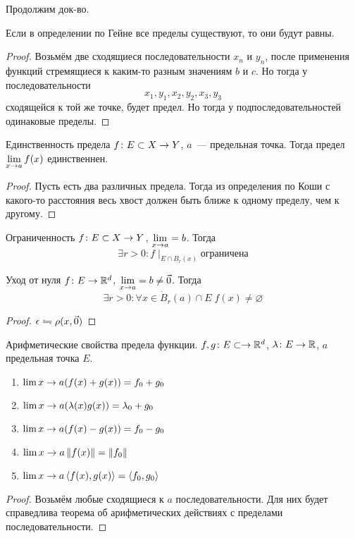 Продолжим док-во.

\begin{Rem}
Если в определении по Гейне все пределы существуют, то они будут равны.
\end{Rem}
\begin{proof}
Возьмём две сходящиеся последовательности $x_n$ и $y_n$, после применения функций стремящиеся к каким-то разным значениям $b$ и $c$. Но тогда
у последовательности 
$$x_1, y_1, x_2, y_2, x_3, y_3$$
сходящейся к той же точке, будет предел. Но тогда у подпоследовательностей одинаковые пределы.
\end{proof}

\begin{assertion}{Единственность предела}
$f\colon E \subset X \rightarrow Y$, $a$~--- предельная точка. Тогда предел $\lim\limits_{x\rightarrow a} f(x)$ единственнен.
\end{assertion}
\begin{proof}
Пусть есть два различных предела. Тогда из определения по Коши с какого-то расстояния весь хвост должен быть ближе к одному пределу, чем к другому.
\end{proof}

\begin{theorem}{Ограниченность}
$f\colon E \subset X \rightarrow Y$, $\lim\limits_{x\rightarrow a} = b$. Тогда 
$$\exists r>0\colon f \mid_{E \cap B_r(x)}\text{ограничена}$$
\end{theorem}

\begin{theorem}{Уход от нуля}
$f\colon E \rightarrow \mathbb{R}^d$, $\lim\limits_{x\rightarrow a} = b \ne \vec 0$. Тогда
$$\exists r>0\colon \forall x \in \dot B_r(a) \cap E\; f(x) \ne \varnothing$$
\end{theorem}
\begin{proof}
$\epsilon \leftrightharpoons \rho(x, \vec 0)$
\end{proof}

\begin{theorem}{Арифметические свойства предела функции.}
$f, g\colon E \subset \rightarrow \mathbb{R}^d$, $\lambda\colon E \rightarrow \mathbb{R}$, $a$ предельная точка $E$.
\begin{enumerate}
\item $\lim\limits{x\rightarrow a} (f(x) + g(x)) = f_0 + g_0$
\item $\lim\limits{x\rightarrow a} (\lambda(x)  g(x)) = \lambda_0 + g_0$
\item $\lim\limits{x\rightarrow a} (f(x) - g(x)) = f_0 - g_0$
\item $\lim\limits{x\rightarrow a} \left\|f(x)\right\| = \left\|f_0\right\|$
\item $\lim\limits{x\rightarrow a} \left<f(x), g(x)\right> = \left<f_0, g_0\right>$
\end{enumerate}
\end{theorem}
\begin{proof}
Возьмём любые сходящиеся к $a$ последовательности. Для них будет справедлива теорема об арифметических действиях с пределами последовательности.
\end{proof}

